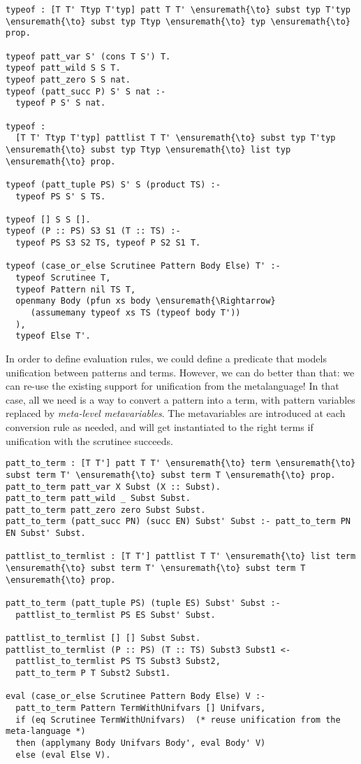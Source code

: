 \begin{verbatim}
typeof : [T T' Ttyp T'typ] patt T T' \ensuremath{\to} subst typ T'typ \ensuremath{\to} subst typ Ttyp \ensuremath{\to} typ \ensuremath{\to} prop.

typeof patt_var S' (cons T S') T.
typeof patt_wild S S T.
typeof patt_zero S S nat.
typeof (patt_succ P) S' S nat :-
  typeof P S' S nat.

typeof :
  [T T' Ttyp T'typ] pattlist T T' \ensuremath{\to} subst typ T'typ \ensuremath{\to} subst typ Ttyp \ensuremath{\to} list typ \ensuremath{\to} prop.

typeof (patt_tuple PS) S' S (product TS) :-
  typeof PS S' S TS.

typeof [] S S [].
typeof (P :: PS) S3 S1 (T :: TS) :-
  typeof PS S3 S2 TS, typeof P S2 S1 T.

typeof (case_or_else Scrutinee Pattern Body Else) T' :-
  typeof Scrutinee T,
  typeof Pattern nil TS T,
  openmany Body (pfun xs body \ensuremath{\Rightarrow}
     (assumemany typeof xs TS (typeof body T'))
  ),
  typeof Else T'.
\end{verbatim}

In order to define evaluation rules, we could define a predicate that
models unification between patterns and terms. However, we can do better
than that: we can re-use the existing support for unification from the
metalanguage! In that case, all we need is a way to convert a pattern
into a term, with pattern variables replaced by \emph{meta-level
metavariables}. The metavariables are introduced at each conversion rule
as needed, and will get instantiated to the right terms if unification
with the scrutinee succeeds.

\begin{verbatim}
patt_to_term : [T T'] patt T T' \ensuremath{\to} term \ensuremath{\to} subst term T' \ensuremath{\to} subst term T \ensuremath{\to} prop.
patt_to_term patt_var X Subst (X :: Subst).
patt_to_term patt_wild _ Subst Subst.
patt_to_term patt_zero zero Subst Subst.
patt_to_term (patt_succ PN) (succ EN) Subst' Subst :- patt_to_term PN EN Subst' Subst.

pattlist_to_termlist : [T T'] pattlist T T' \ensuremath{\to} list term \ensuremath{\to} subst term T' \ensuremath{\to} subst term T \ensuremath{\to} prop.

patt_to_term (patt_tuple PS) (tuple ES) Subst' Subst :-
  pattlist_to_termlist PS ES Subst' Subst.

pattlist_to_termlist [] [] Subst Subst.
pattlist_to_termlist (P :: PS) (T :: TS) Subst3 Subst1 <-
  pattlist_to_termlist PS TS Subst3 Subst2,
  patt_to_term P T Subst2 Subst1.

eval (case_or_else Scrutinee Pattern Body Else) V :-
  patt_to_term Pattern TermWithUnifvars [] Unifvars,
  if (eq Scrutinee TermWithUnifvars)  (* reuse unification from the meta-language *)
  then (applymany Body Unifvars Body', eval Body' V)
  else (eval Else V).
\end{verbatim}

